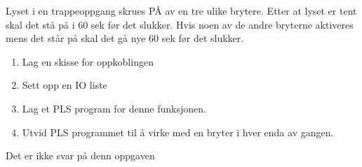 


Lyset i en trappeoppgang skrues PÅ av en tre ulike brytere. Etter at lyset er tent skal det stå på i 60 sek før det slukker. Hvis noen av de andre bryterne aktiveres mens det står på skal det gå nye 60 sek før det slukker.
\begin{enumerate}
\item Lag en skisse for oppkoblingen
\item Sett opp en IO liste
\item Lag et PLS program for denne funksjonen.
\item Utvid PLS programmet til å virke med en bryter i hver enda av gangen. 
\end{enumerate}
\vskip 10pt





Det er ikke svar på denn oppgaven













